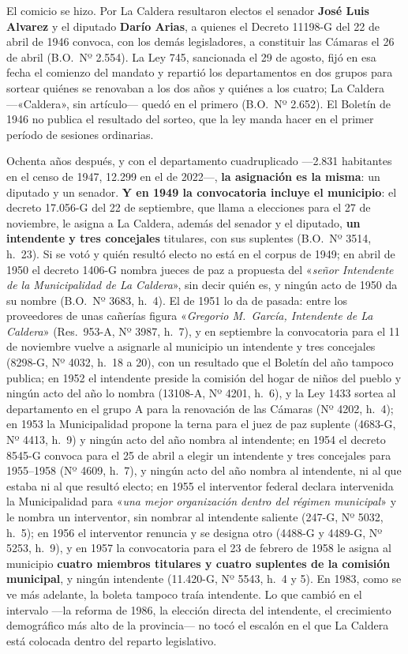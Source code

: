 El comicio se hizo. Por La Caldera resultaron electos el senador \textbf{José Luis Alvarez} y el diputado \textbf{Darío Arias}, a quienes el Decreto 11198-G del 22 de abril de 1946 convoca, con los demás legisladores, a constituir las Cámaras el 26 de abril (B.O.\ Nº 2.554). La Ley 745, sancionada el 29 de agosto, fijó en esa fecha el comienzo del mandato y repartió los departamentos en dos grupos para sortear quiénes se renovaban a los dos años y quiénes a los cuatro; La Caldera ---«Caldera», sin artículo--- quedó en el primero (B.O.\ Nº 2.652). El Boletín de 1946 no publica el resultado del sorteo, que la ley manda hacer en el primer período de sesiones ordinarias.

Ochenta años después, y con el departamento cuadruplicado ---2.831 habitantes en el censo de 1947, 12.299 en el de 2022---, \textbf{la asignación es la misma}:
un diputado y un senador. \textbf{Y en 1949 la convocatoria incluye el municipio}: el decreto 17.056-G del 22 de septiembre, que llama a elecciones para el 27 de noviembre, le asigna a La Caldera, además del senador y el diputado, \textbf{un intendente y tres concejales} titulares, con sus suplentes (B.O.\ Nº 3514, h.\ 23). Si se votó y quién resultó electo no está en el corpus de 1949; en abril de 1950 el decreto 1406-G nombra jueces de paz a propuesta del «\textit{señor Intendente de la Municipalidad de La Caldera}», sin decir quién es, y ningún acto de 1950 da su nombre (B.O.\ Nº 3683, h.\ 4). El de 1951 lo da de pasada: entre los proveedores de unas cañerías figura «\textit{Gregorio M.\ García, Intendente de La Caldera}» (Res.\ 953-A, Nº 3987, h.\ 7), y en septiembre la convocatoria para el 11 de noviembre vuelve a asignarle al municipio un intendente y tres concejales (8298-G, Nº 4032, h.\ 18 a 20), con un resultado que el Boletín del año tampoco publica; en 1952 el intendente preside la comisión del hogar de niños del pueblo y ningún acto del año lo nombra (13108-A, Nº 4201, h.\ 6), y la Ley 1433 sortea al departamento en el grupo A para la renovación de las Cámaras (Nº 4202, h.\ 4); en 1953 la Municipalidad propone la terna para el juez de paz suplente (4683-G, Nº 4413, h.\ 9) y ningún acto del año nombra al intendente; en 1954 el decreto 8545-G convoca para el 25 de abril a elegir un intendente y tres concejales para 1955--1958 (Nº 4609, h.\ 7), y ningún acto del año nombra al intendente, ni al que estaba ni al que resultó electo; en 1955 el interventor federal declara intervenida la Municipalidad para «\textit{una mejor organización dentro del régimen municipal}» y le nombra un interventor, sin nombrar al intendente saliente (247-G, Nº 5032, h.\ 5); en 1956 el interventor renuncia y se designa otro (4488-G y 4489-G, Nº 5253, h.\ 9), y en 1957 la convocatoria para el 23 de febrero de 1958 le asigna al municipio \textbf{cuatro miembros titulares y cuatro suplentes de la comisión municipal}, y ningún intendente (11.420-G, Nº 5543, h.\ 4 y 5). En 1983, como se ve más adelante, la boleta tampoco traía intendente. Lo que cambió en el intervalo ---la reforma de 1986, la elección
directa del intendente, el crecimiento demográfico más alto de la provincia--- no tocó el
escalón en el que La Caldera está colocada dentro del reparto legislativo.

